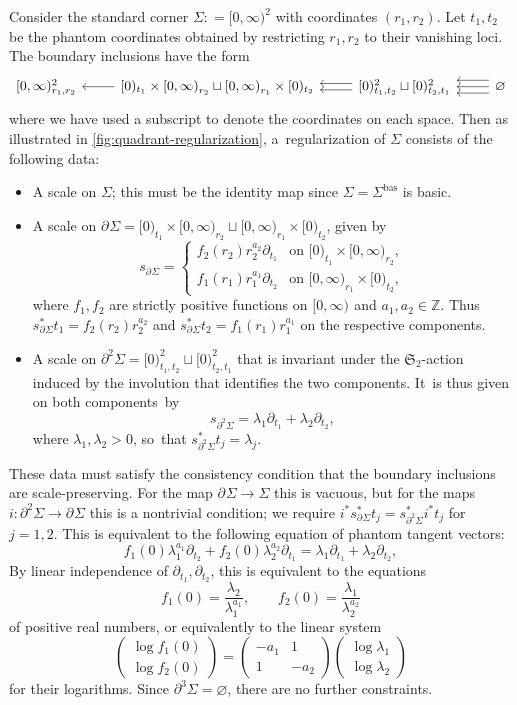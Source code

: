 \documentclass[JEP,XML,SOM,Unicode,NoFloatCountersInSection,published]{cedram}
\theoremstyle{definition}
\theoremstyle{remark}
\newenvironment{example}
  {\pushQED{\qed}\renewcommand{\qedsymbol}{$\lozenge$}\examplex}
  {\popQED\endexamplex}
\newcommand{\ZZ}{\mathbb{Z}}
\newcommand{\halfspc}[1]{[0,\infty)^{#1}}
\newcommand{\defas}{\mathrel{\mathop:}=}
\newcommand{\cvf}[1]{\partial_{#1}}
\newcommand{\Sig}{\Sigma}
\newcommand{\bas}[1]{{#1}^{\mathrm{bas}}}
\newcommand{\Sigbas}{\bas{\Sig}}
\newcommand{\bdSig}[1][]{\partial^{#1}\Sigma}
\newcommand{\symgp}[1]{\mathfrak{S}_{#1}}
\newcommand{\augsimpshort}[4]
{
\begin{tikzcd}[ampersand replacement=\&]
     #1 \& #2 \ar[l] \& #3
     \ar[l,shift left = 1]\ar[l,shift right=1] \& \ar[l,shift left = 2]\ar[l,shift left = 0]\ar[l,shift left = -2]  #4
    \end{tikzcd}
}
\begin{document}
\begin{example}
Consider the standard corner $\Sig \defas \halfspc{2}$ with coordinates $(r_1,r_2)$. Let $t_1,t_2$ be the phantom coordinates obtained by restricting $r_1,r_2$ to their vanishing loci. The boundary inclusions have the form
\[
\augsimpshort{\halfspc{2}_{r_1,r_2}}{{[0)_{t_1}\times\halfspc{}_{r_2} \sqcup \halfspc{}_{r_1}\times[0)_{t_2}}}
{{[0)^2_{t_1,t_2} \sqcup [0)^2_{t_2,t_1}}}{\varnothing}
\]
where we have used a subscript to denote the coordinates on each space. Then as illustrated in \autoref{fig:quadrant-regularization}, a~regularization of $\Sig$ consists of the following data:
\begin{itemize}
\item A scale on $\Sig$; this must be the identity map since $\Sig=\Sigbas$ is basic.
\item A scale on $\bdSig = {[0)_{t_1}\times\halfspc{}_{r_2} \sqcup \halfspc{}_{r_1}\times[0)_{t_2}}$, given by
\[
s_{\bdSig} = \begin{cases}
f_2(r_2)r_2^{a_2}\cvf{t_1} & \textrm{on }[0)_{t_1} \times \halfspc{}_{r_2}, \\
f_1(r_1)r_1^{a_1}\cvf{t_2} & \textrm{on }[0,\infty)_{r_1}\times [0)_{t_2},
\end{cases}
\]
where $f_1,f_2$ are strictly positive functions on $\halfspc{}$ and $a_1,a_2 \in \ZZ$. Thus $s_{\bdSig}^* t_1 = f_2(r_2) r_2^{a_2}$ and $s_{\bdSig}^*t_2 = f_1(r_1) r_1^{a_1}$ on the respective components.
\item A scale on $\bdSig[2] = [0)^2_{t_1,t_2} \sqcup [0)^2_{t_2,t_1}$ that is invariant under the $\symgp{2}$-action induced by the involution that identifies the two components. It~is thus given on both components~by
\[
s_{\bdSig[2]} = \lambda_1 \cvf{t_1} + \lambda_2 \cvf{t_2},
\]
where $\lambda_1,\lambda_2 > 0$, so~that $s_{\bdSig[2]}^*t_j = \lambda_j$.
\end{itemize}
These data must satisfy the consistency condition that the boundary inclusions are scale-preserving. For the map $\bdSig \to \Sig$ this is vacuous, but for the maps $i \colon \bdSig[2]\to\bdSig$ this is a nontrivial condition; we require $i^*s_{\bdSig}^*t_j = s_{\bdSig[2]}^*i^*t_j$ for $j=1,2$. This is equivalent to the following equation of phantom tangent vectors:
\[
f_1(0) \lambda_1^{a_1}\cvf{t_2} + f_2(0)\lambda_2^{a_2}\cvf{t_1} = \lambda_1 \cvf{t_1} + \lambda_2 \cvf{t_2},
\]
By linear independence of $\cvf{t_1},\cvf{t_2}$, this is equivalent to the equations
\[
f_1(0) = \frac{\lambda_2}{\lambda_1^{a_1}},\qquad
f_2(0) = \frac{\lambda_1}{\lambda_2^{a_2}}
\]
of positive real numbers, or equivalently to the linear system
\[
\begin{pmatrix}
\log f_1(0) \\ \log f_2(0)
\end{pmatrix} = \begin{pmatrix}
-a_1 & 1 \\
1 & -a_2
\end{pmatrix}\begin{pmatrix}
\log \lambda_1 \\
\log \lambda_2
\end{pmatrix}
\]
for their logarithms. Since $\bdSig[3]=\varnothing$, there are no further constraints.


\end{example}
\end{document}
